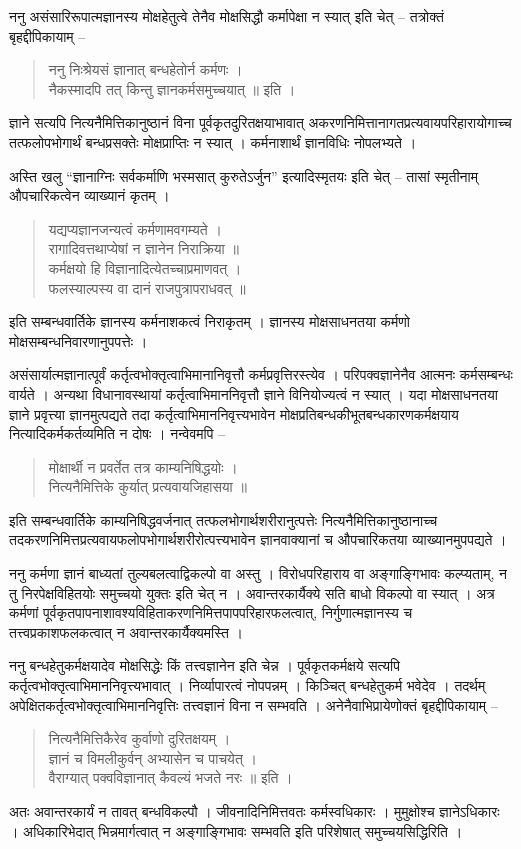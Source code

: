 ननु असंसारिरूपात्मज्ञानस्य मोक्षहेतुत्वे तेनैव मोक्षसिद्धौ कर्मापेक्षा न स्यात् इति चेत् – तत्रोक्तं बृहद्दीपिकायाम् –
\begin{verse}
ननु निःश्रेयसं ज्ञानात् बन्धहेतोर्न कर्मणः ।\\
नैकस्मादपि तत् किन्तु ज्ञानकर्मसमुच्चयात् ॥ इति ।
\end{verse}
ज्ञाने सत्यपि नित्यनैमित्तिकानुष्ठानं विना पूर्वकृतदुरितक्षयाभावात् अकरणनिमित्तानागतप्रत्यवायपरिहारायोगाच्च तत्फलोपभोगार्थं बन्धप्रसक्तेः मोक्षप्राप्तिः न स्यात् । कर्मनाशार्थं ज्ञानविधिः नोपलभ्यते ।

अस्ति खलु “ज्ञानाग्निः सर्वकर्माणि भस्मसात् कुरुतेऽर्जुन” इत्यादिस्मृतयः इति चेत् – तासां स्मृतीनाम् औपचारिकत्वेन व्याख्यानं कृतम् ।
\begin{verse}
यद्यप्यज्ञानजन्यत्वं कर्मणामवगम्यते ।\\
रागादिवत्तथाप्येषां न ज्ञानेन निराक्रिया ॥\\
कर्मक्षयो हि विज्ञानादित्येतच्चाप्रमाणवत् ।\\
फलस्याल्पस्य वा दानं राजपुत्रापराधवत् ॥
\end{verse}
इति सम्बन्धवार्तिके ज्ञानस्य कर्मनाशकत्वं निराकृतम् । ज्ञानस्य मोक्षसाधनतया कर्मणो मोक्षसम्बन्धनिवारणानुपपत्तेः ।

असंसार्यात्मज्ञानात्पूर्वं कर्तृत्वभोक्तृत्वाभिमानानिवृत्तौ कर्मप्रवृत्तिरस्त्येव । परिपक्वज्ञानेनैव आत्मनः कर्मसम्बन्धः वार्यते । अन्यथा विधानावस्थायां कर्तृत्वाभिमाननिवृत्तौ ज्ञाने विनियोज्यत्वं न स्यात् । यदा मोक्षसाधनतया ज्ञाने प्रवृत्त्या ज्ञानमुत्पद्यते तदा कर्तृत्वाभिमाननिवृत्त्यभावेन मोक्षप्रतिबन्धकीभूतबन्धकारणकर्मक्षयाय नित्यादिकर्मकर्तव्यमिति न दोषः । नन्वेवमपि –
\begin{verse}
मोक्षार्थी न प्रवर्तेत तत्र काम्यनिषिद्धयोः ।\\
नित्यनैमित्तिके कुर्यात् प्रत्यवायजिहासया ॥
\end{verse}
इति सम्बन्धवार्तिके काम्यनिषिद्धवर्जनात् तत्फलभोगार्थशरीरानुत्पत्तेः नित्यनैमित्तिकानुष्ठानाच्च तदकरणनिमित्तप्रत्यवायफलोपभोगार्थशरीरोत्पत्त्यभावेन ज्ञानवाक्यानां च औपचारिकतया व्याख्यानमुपपद्यते ।

ननु कर्मणा ज्ञानं बाध्यतां तुल्यबलत्वाद्विकल्पो वा अस्तु । विरोधपरिहाराय वा अङ्गाङ्गिभावः कल्प्यताम्, न तु निरपेक्षविहितयोः समुच्चयो युक्तः इति चेत् न । अवान्तरकार्यैक्ये सति बाधो विकल्पो वा स्यात् । अत्र कर्मणां पूर्वकृतपापनाशावश्यविहिताकरणनिमित्तपापपरिहारफलत्वात्, निर्गुणात्मज्ञानस्य च तत्त्वप्रकाशफलकत्वात् न अवान्तरकार्यैक्यमस्ति ।

ननु बन्धहेतुकर्मक्षयादेव मोक्षसिद्धेः किं तत्त्वज्ञानेन इति चेन्न । पूर्वकृतकर्मक्षये सत्यपि कर्तृत्वभोक्तृत्वाभिमाननिवृत्त्यभावात् । निर्व्यापारत्वं नोपपन्नम् । किञ्चित् बन्धहेतुकर्म भवेदेव । तदर्थम् अपेक्षितकर्तृत्वभोक्तृत्वाभिमाननिवृत्तिः तत्त्वज्ञानं विना न सम्भवति । अनेनैवाभिप्रायेणोक्तं बृहद्दीपिकायाम् –
\begin{verse}
नित्यनैमित्तिकैरेव कुर्वाणो दुरितक्षयम् ।\\
ज्ञानं च विमलीकुर्वन् अभ्यासेन च पाचयेत् ।\\
वैराग्यात् पक्वविज्ञानात् कैवल्यं भजते नरः ॥ इति ।
\end{verse}
अतः अवान्तरकार्यं न तावत् बन्धविकल्पौ । जीवनादिनिमित्तवतः कर्मस्वधिकारः । मुमुक्षोश्च ज्ञानेऽधिकारः । अधिकारिभेदात् भिन्नमार्गत्वात् न अङ्गाङ्गिभावः सम्भवति इति परिशेषात् समुच्चयसिद्धिरिति ।

